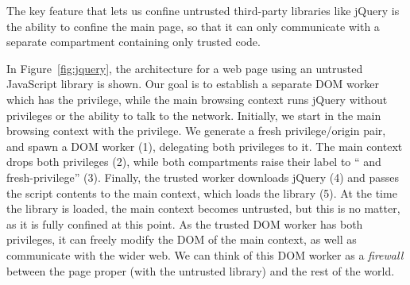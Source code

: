 The key feature that lets us confine untrusted third-party libraries
like jQuery is the ability to confine the main page, so that it can
only communicate with a separate compartment containing only trusted code.

In Figure~\ref{fig:jquery}, the architecture for a web page using an
untrusted JavaScript library is shown.  Our goal is to establish a
separate DOM worker which has the  privilege, while the
main browsing context runs jQuery without privileges or the ability to
talk to the network.  Initially, we start in the main browsing context
with the  privilege.  We generate a fresh privilege/origin
pair, and spawn a DOM worker (1), delegating both privileges to it.  The
main context drops both privileges (2), while both compartments raise
their label to `` and fresh-privilege'' (3).  Finally, the
trusted worker downloads jQuery (4) and passes the script contents to
the main context, which loads the library (5).  At the time the library
is loaded, the main context becomes untrusted, but this is no matter, as
it is fully confined at this point.  As the trusted DOM worker has both
privileges, it can freely modify the DOM of the main context, as well as
communicate with the wider web.  We can think of this DOM worker as a
\emph{firewall} between the page proper (with the untrusted library)
and the rest of the world.
